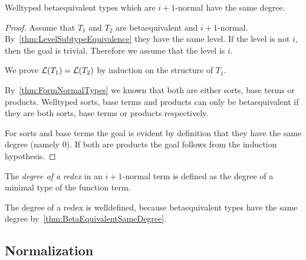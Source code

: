 \begin{theorem}
    Welltyped betaequivalent types which are $i+1$-normal have the same degree.
    \label{thm:BetaEquivalentSameDegree}
    \begin{proof}
        Assume that $T_1$ and $T_2$ are betaequivalent and $i+1$-normal.
        By~\ref{thm:LevelSubtypeEquivalence} they have the same level. If the
        level is not $i$, then the goal is trivial. Therefore we assume that the
        level is $i$.

        We prove ${\cal L}(T_1) = {\cal L}(T_2)$ by induction on the structure of
        $T_1$.

        By~\ref{thm:FormNormalTypes} we known that both are either sorts, base
        terms or products. Welltyped sorts, base terms and products can only be
        betaequivalent if they are both sorts, base terms or products respectively.


        For sorts and base terms the goal is evident by definition that
        they have the same degree (namely 0). If both are products the goal
        follows from the induction hypothesis.
    \end{proof}
\end{theorem}





\begin{definition}
    \label{def:RedexDegree}
    The \emph{degree of a redex} in an $i+1$-normal term is defined as the
    degree of a minimal type of the function term.

    The degree of a redex is welldefined, because betaequivalent types have the
    same degree by~\ref{thm:BetaEquivalentSameDegree}.
\end{definition}







\subsection{Normalization}


